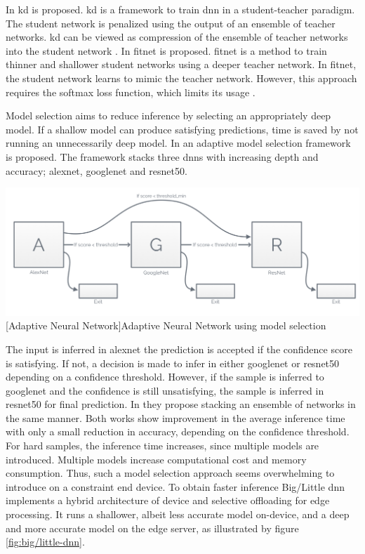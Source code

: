 \begin{enumdescript}
	In \cite{hinton_distilling_2015} \gls{kd} is proposed. \gls{kd} is a framework to train \gls{dnn} in a student-teacher paradigm. The student network is penalized using the output of an ensemble of teacher networks. \gls{kd} can be viewed as compression of the ensemble of teacher networks into the student network \cite{cheng_survey_2017}. 
	In \cite{romero_fitnets:_2014} \gls{fitnet} is proposed. \gls{fitnet} is a method to train thinner and shallower student networks using a deeper teacher network. In \gls{fitnet}, the student network learns to mimic the teacher network. However, this approach requires the softmax loss function, which limits its usage \cite{cheng_survey_2017}.  
	
	\item[Model Selection] Model selection aims to reduce inference by selecting an appropriately deep model. If a shallow model can produce satisfying predictions, time is saved by not running an unnecessarily deep model. In \cite{bolukbasi_adaptive_2017} an adaptive model selection framework is proposed. The framework stacks three \gls{dnn}s with increasing depth and accuracy; \gls{alexnet}, \gls{googlenet} and \gls{resnet}50. 
	
	\begin{minipage}[t]{\linewidth}
		\centering                           
		\includegraphics[width=.8\linewidth]{figures/models/adaptive}
		[Adaptive Neural Network]{Adaptive Neural Network using model selection}
	\end{minipage}
	
	The input is inferred in \gls{alexnet} the prediction is accepted if the confidence score is satisfying. If not, a decision is made to infer in either \gls{googlenet} or \gls{resnet}50 depending on a confidence threshold. However, if the sample is inferred to \gls{googlenet} and the confidence is still unsatisfying, the sample is inferred in \gls{resnet}50 for final prediction. In \cite{tann_flexible_2018} they propose stacking an ensemble of networks in the same manner. Both works show improvement in the average inference time with only a small reduction in accuracy, depending on the confidence threshold. For hard samples, the inference time increases, since multiple models are introduced. Multiple models increase computational cost and memory consumption. Thus, such a model selection approach seems overwhelming to introduce on a constraint end device. 	
	To obtain faster inference Big/Little \gls{dnn} \cite{park_big/little_2015} implements a hybrid architecture of device and selective offloading for edge processing. It runs a shallower, albeit less accurate model on-device, and a deep and more accurate model on the edge server, as illustrated by figure \ref{fig:big/little-dnn}. 
	

\end{enumdescript}
